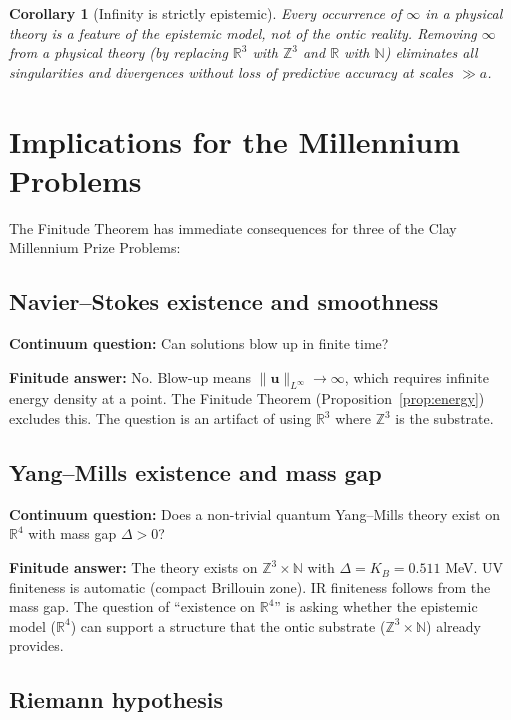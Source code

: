 \documentclass[11pt]{article}
\theoremstyle{tight}
\newtheorem{corollary}[theorem]{Corollary}
\theoremstyle{plainroman}
\newcommand{\R}{\mathbb{R}}
\newcommand{\Z}{\mathbb{Z}}
\newcommand{\N}{\mathbb{N}}
\begin{document}
\begin{corollary}[Infinity is strictly epistemic]\label{cor:epistemic}
Every occurrence of $\infty$ in a physical theory is a feature of the epistemic model, not of the ontic reality.
Removing $\infty$ from a physical theory (by replacing $\R^3$ with $\Z^3$ and $\R$ with $\N$) eliminates all singularities and divergences without loss of predictive accuracy at scales $\gg a$.
\end{corollary}

\section{Implications for the Millennium Problems}

The Finitude Theorem has immediate consequences for three of the Clay Millennium Prize Problems:

\subsection{Navier--Stokes existence and smoothness}

\textbf{Continuum question:} Can solutions blow up in finite time?

\textbf{Finitude answer:} No. Blow-up means $\|\mathbf u\|_{L^\infty}\to\infty$, which requires infinite energy density at a point.
The Finitude Theorem (Proposition~\ref{prop:energy}) excludes this.
The question is an artifact of using $\R^3$ where $\Z^3$ is the substrate.

\subsection{Yang--Mills existence and mass gap}

\textbf{Continuum question:} Does a non-trivial quantum Yang--Mills theory exist on $\R^4$ with mass gap $\Delta>0$?

\textbf{Finitude answer:} The theory exists on $\Z^3\times\N$ with $\Delta=K_B=0.511$ MeV.
UV finiteness is automatic (compact Brillouin zone).
IR finiteness follows from the mass gap.
The question of ``existence on $\R^4$'' is asking whether the epistemic model ($\R^4$) can support a structure that the ontic substrate ($\Z^3\times\N$) already provides.

\subsection{Riemann hypothesis}
\end{document}

